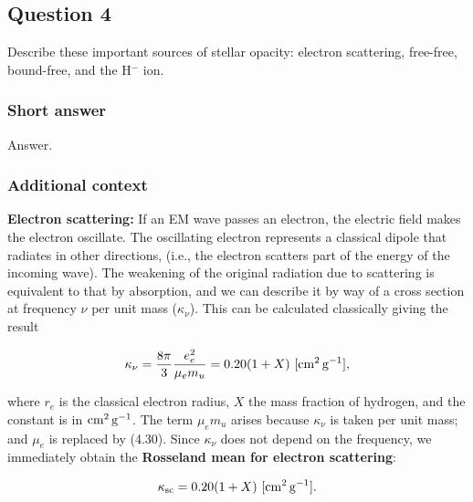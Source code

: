 \documentclass[a4paper,10pt]{article}
\begin{document}

\newpage
\subsection{Question 4}

Describe these important sources of stellar opacity: electron scattering, free-free, bound-free, and the H$^-$ ion.

\subsubsection{Short answer}

Answer.

\subsubsection{Additional context}

{\noindent}\textbf{Electron scattering:} If an EM wave passes an electron, the electric field makes the electron oscillate. The oscillating electron represents a classical dipole that radiates in other directions, (i.e., the electron scatters part of the energy of the incoming wave). The weakening of the original radiation due to scattering is equivalent to that by absorption, and we can describe it by way of a cross section at frequency $\nu$ per unit mass ($\kappa_\nu$). This can be calculated classically giving the result

\begin{align*}
    \kappa_\nu = \frac{8\pi}{3} \frac{e_e^2}{\mu_em_u} = 0.20(1+X) ~ [{\rm cm^2\,g^{-1}}],
\end{align*}

{\noindent}where $r_e$ is the classical electron radius, $X$ the mass fraction of hydrogen, and the constant is in ${\rm cm^2\,g^{-1}}$. The term $\mu_em_u$ arises because $\kappa_\nu$ is taken per unit mass; and $\mu_e$ is replaced by (4.30). Since $\kappa_\nu$ does not depend on the frequency, we immediately obtain the \textbf{Rosseland mean for electron scattering}:

\begin{align*}
    \kappa_{\rm sc} = 0.20(1+X) ~ [{\rm cm^2\,g^{-1}}].
\end{align*}
\end{document}
